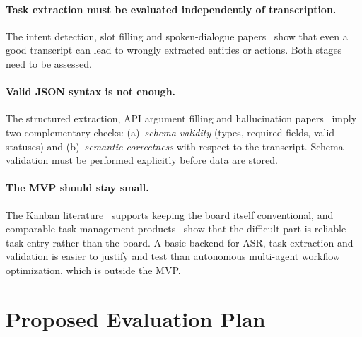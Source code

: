 \documentclass[11pt,a4paper]{article}
\begin{document}
\paragraph{Task extraction must be evaluated independently of transcription.}
The intent detection, slot filling and spoken-dialogue papers~\cite{weld2022survey,si2023spokenwoz,sun2024speech} show that even a good transcript can lead to wrongly extracted entities or actions. Both stages need to be assessed.

\paragraph{Valid JSON syntax is not enough.}
The structured extraction, API argument filling and hallucination papers~\cite{li2024simple,mok2024llm,hoang2026structured} imply two complementary checks: (a)~\emph{schema validity} (types, required fields, valid statuses) and (b)~\emph{semantic correctness} with respect to the transcript. Schema validation must be performed explicitly before data are stored.

\paragraph{The MVP should stay small.}
The Kanban literature~\cite{ahmad2018kanban} supports keeping the board itself conventional, and comparable task-management products~\cite{adebanjo2026taskwise} show that the difficult part is reliable task entry rather than the board. A basic backend for ASR, task extraction and validation is easier to justify and test than autonomous multi-agent workflow optimization, which is outside the MVP.

\section{Proposed Evaluation Plan}
\end{document}
